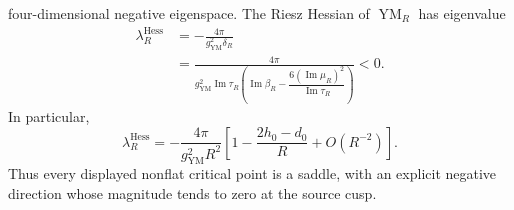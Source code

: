 \begin{theorem}
four-dimensional negative eigenspace.  The Riesz Hessian of
\(\operatorname{YM}_R\) has eigenvalue
\begin{align}
 \lambda_R^{\mathrm{Hess}}
 &=-\frac{4\pi}{g_{\mathrm{YM}}^2\delta_R}
 \label{eq:s6cusp-negative-riesz-eigenvalue}\\
 &=\frac{4\pi}{g_{\mathrm{YM}}^2
 \operatorname{Im}\tau_R
 \left(
  \operatorname{Im}\beta_R-
  \dfrac{6(\operatorname{Im}\mu_R)^2}
  {\operatorname{Im}\tau_R}
 \right)}<0.
 \label{eq:s6cusp-negative-riesz-unchanged}
\end{align}
In particular,
\begin{equation}\label{eq:s6cusp-negative-mode-cusp}
 \lambda_R^{\mathrm{Hess}}
 =-\frac{4\pi}{g_{\mathrm{YM}}^2R^2}
 \left[
  1-\frac{2h_0-d_0}{R}+O(R^{-2})
 \right].
\end{equation}
Thus every displayed nonflat critical point is a saddle, with an explicit
negative direction whose magnitude tends to zero at the source cusp.
\end{theorem}

